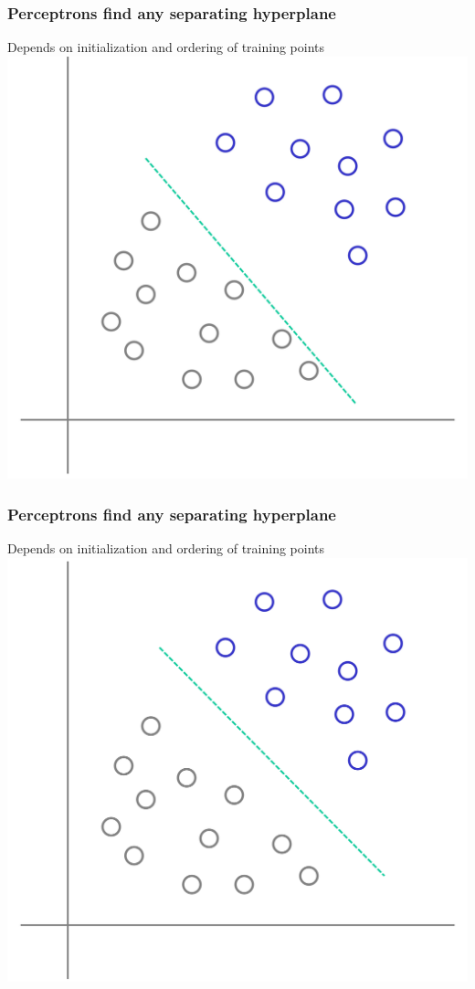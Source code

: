 \documentclass[12pt,notes,mathserif]{beamer}
\begin{document}
\begin{frame}[c]
\frametitle{Perceptrons find any separating hyperplane}
\begin{center}
Depends on initialization and ordering of training points\\
\includegraphics[width=0.7\linewidth]{fig8/lec84.jpg}
\end{center}
\end{frame}

\begin{frame}[c]
\frametitle{Perceptrons find any separating hyperplane}
\begin{center}
Depends on initialization and ordering of training points\\
\includegraphics[width=0.7\linewidth]{fig8/lec85.jpg}
\end{center}
\end{frame}
\end{document}
